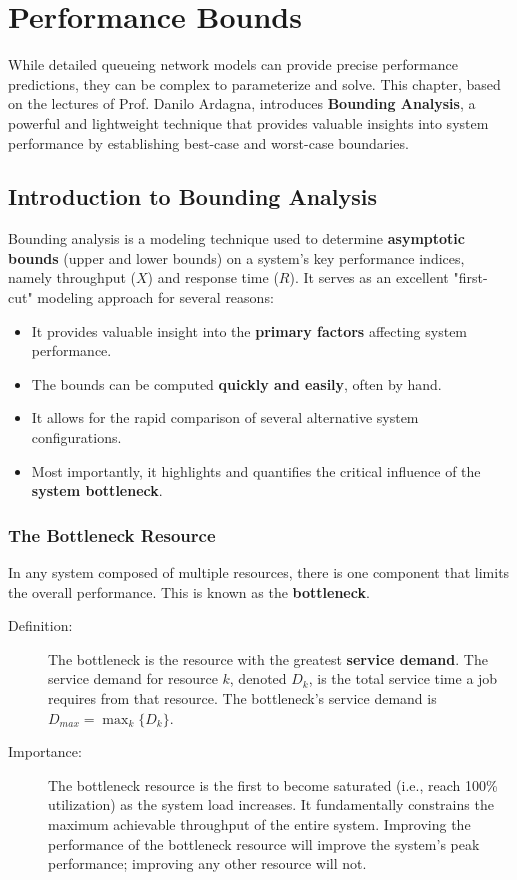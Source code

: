 \chapter{Performance Bounds}
\label{chap:performance_bounds}

While detailed queueing network models can provide precise performance predictions, they can be complex to parameterize and solve. This chapter, based on the lectures of Prof. Danilo Ardagna, introduces \textbf{Bounding Analysis}, a powerful and lightweight technique that provides valuable insights into system performance by establishing best-case and worst-case boundaries.

\section{Introduction to Bounding Analysis}

Bounding analysis is a modeling technique used to determine \textbf{asymptotic bounds} (upper and lower bounds) on a system's key performance indices, namely throughput ($X$) and response time ($R$). It serves as an excellent "first-cut" modeling approach for several reasons:
\begin{itemize}
    \item It provides valuable insight into the \textbf{primary factors} affecting system performance.
    \item The bounds can be computed \textbf{quickly and easily}, often by hand.
    \item It allows for the rapid comparison of several alternative system configurations.
    \item Most importantly, it highlights and quantifies the critical influence of the \textbf{system bottleneck}.
\end{itemize}

\subsection{The Bottleneck Resource}
In any system composed of multiple resources, there is one component that limits the overall performance. This is known as the \textbf{bottleneck}.
\begin{description}
    \item[Definition:] The bottleneck is the resource with the greatest \textbf{service demand}. The service demand for resource $k$, denoted $D_k$, is the total service time a job requires from that resource. The bottleneck's service demand is $D_{max} = \max_k \{D_k\}$.
    \item[Importance:] The bottleneck resource is the first to become saturated (i.e., reach 100\% utilization) as the system load increases. It fundamentally constrains the maximum achievable throughput of the entire system. Improving the performance of the bottleneck resource will improve the system's peak performance; improving any other resource will not.
\end{description}

